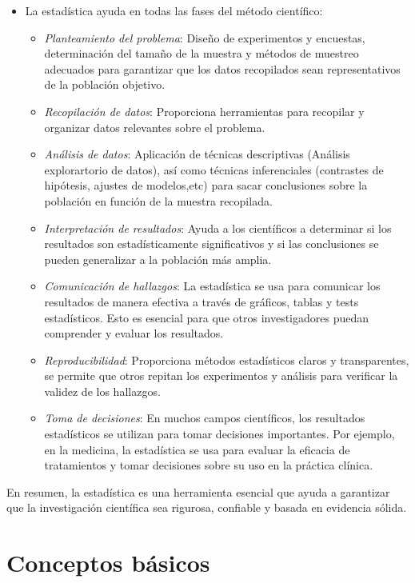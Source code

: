\documentclass[
  letterpaper,
  DIV=11,
  numbers=noendperiod]{scrreprt}
\begin{document}
\begin{itemize}
\item
  La estadística ayuda en todas las fases del método científico:

  \begin{itemize}
  \item
    {\emph{Planteamiento del problema}}: Diseño de experimentos y
    encuestas, determinación del tamaño de la muestra y métodos de
    muestreo adecuados para garantizar que los datos recopilados sean
    representativos de la población objetivo.
  \item
    {\emph{Recopilación de datos}}: Proporciona herramientas para
    recopilar y organizar datos relevantes sobre el problema.
  \item
    {\emph{Análisis de datos}}: Aplicación de técnicas descriptivas
    (Análisis explorartorio de datos), así como técnicas inferenciales
    (contrastes de hipótesis, ajustes de modelos,etc) para sacar
    conclusiones sobre la población en función de la muestra recopilada.
  \item
    {\emph{Interpretación de resultados}}: Ayuda a los científicos a
    determinar si los resultados son estadísticamente significativos y
    si las conclusiones se pueden generalizar a la población más amplia.
  \item
    {\emph{Comunicación de hallazgos}}: La estadística se usa para
    comunicar los resultados de manera efectiva a través de gráficos,
    tablas y tests estadísticos. Esto es esencial para que otros
    investigadores puedan comprender y evaluar los resultados.
  \item
    {\emph{Reproducibilidad}}: Proporciona métodos estadísticos claros y
    transparentes, se permite que otros repitan los experimentos y
    análisis para verificar la validez de los hallazgos.
  \item
    {\emph{Toma de decisiones}}: En muchos campos científicos, los
    resultados estadísticos se utilizan para tomar decisiones
    importantes. Por ejemplo, en la medicina, la estadística se usa para
    evaluar la eficacia de tratamientos y tomar decisiones sobre su uso
    en la práctica clínica.
  \end{itemize}
\end{itemize}

En resumen, la estadística es una herramienta esencial que ayuda a
garantizar que la investigación científica sea rigurosa, confiable y
basada en evidencia sólida.

\section{Conceptos básicos}\label{conceptos-buxe1sicos}
\end{document}
